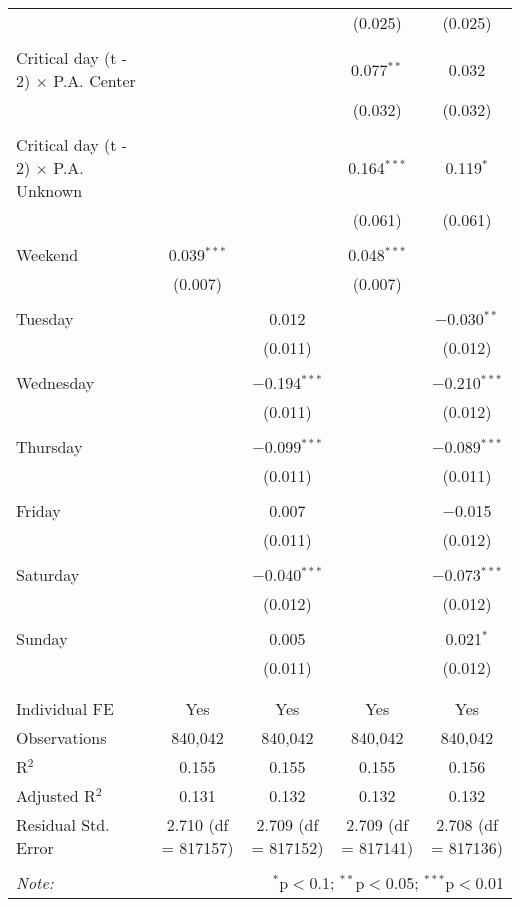 \documentclass[
]{article}
\begin{document}
\begin{table}[!htbp]
{\begin{tabular}{@{\extracolsep{5pt}}lcccc}
  &  &  & (0.025) & (0.025) \\ 
  & & & & \\ 
 Critical day (t - 2) $\times$ P.A. Center &  &  & 0.077$^{**}$ & 0.032 \\ 
  &  &  & (0.032) & (0.032) \\ 
  & & & & \\ 
 Critical day (t - 2) $\times$ P.A. Unknown &  &  & 0.164$^{***}$ & 0.119$^{*}$ \\ 
  &  &  & (0.061) & (0.061) \\ 
  & & & & \\ 
 Weekend & 0.039$^{***}$ &  & 0.048$^{***}$ &  \\ 
  & (0.007) &  & (0.007) &  \\ 
  & & & & \\ 
 Tuesday &  & 0.012 &  & $-$0.030$^{**}$ \\ 
  &  & (0.011) &  & (0.012) \\ 
  & & & & \\ 
 Wednesday &  & $-$0.194$^{***}$ &  & $-$0.210$^{***}$ \\ 
  &  & (0.011) &  & (0.012) \\ 
  & & & & \\ 
 Thursday &  & $-$0.099$^{***}$ &  & $-$0.089$^{***}$ \\ 
  &  & (0.011) &  & (0.011) \\ 
  & & & & \\ 
 Friday &  & 0.007 &  & $-$0.015 \\ 
  &  & (0.011) &  & (0.012) \\ 
  & & & & \\ 
 Saturday &  & $-$0.040$^{***}$ &  & $-$0.073$^{***}$ \\ 
  &  & (0.012) &  & (0.012) \\ 
  & & & & \\ 
 Sunday &  & 0.005 &  & 0.021$^{*}$ \\ 
  &  & (0.011) &  & (0.012) \\ 
  & & & & \\ 
\hline \\[-1.8ex] 
Individual FE & Yes & Yes & Yes & Yes \\ 
Observations & 840,042 & 840,042 & 840,042 & 840,042 \\ 
R$^{2}$ & 0.155 & 0.155 & 0.155 & 0.156 \\ 
Adjusted R$^{2}$ & 0.131 & 0.132 & 0.132 & 0.132 \\ 
Residual Std. Error & 2.710 (df = 817157) & 2.709 (df = 817152) & 2.709 (df = 817141) & 2.708 (df = 817136) \\ 
\hline 
\hline \\[-1.8ex] 
\textit{Note:}  & \multicolumn{4}{r}{$^{*}$p$<$0.1; $^{**}$p$<$0.05; $^{***}$p$<$0.01} \\ 
\end{tabular}
} 
\end{table}
\end{document}
